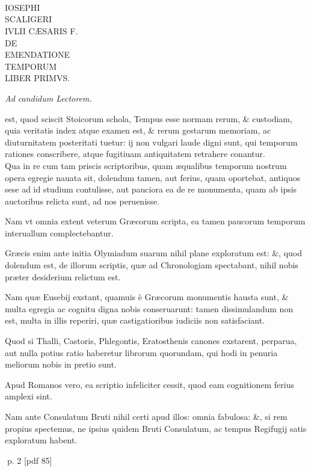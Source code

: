 
\chapter*{}
\begin{center}
\begin{textsc}
\\
\Large IOSEPHI\\
\Huge SCALIGERI\\
\Large IVLII CÆSARIS F.\\
\large DE\\
\Huge EMENDATIONE\\
\Large TEMPORUM\\
\large LIBER PRIMVS.\\
\end{textsc}
\em{Ad candidum Lectorem.}
\end{center}
\normalsize

\setcounter{parcount}{0}
\begin{parnumbers}
est, quod sciscit Stoicorum schola, Tempus esse normam rerum, \& custodiam, quia veritatis index atque examen est, \& rerum gestarum memoriam, ac diuturnitatem posteritati tuetur: ij non vulgari laude digni sunt, qui temporum rationes conscribere, atque fugitiuam antiquitatem retrahere conantur.
\\ \p
Qua in re cum tam priscis scriptoribus, quam æqualibus temporum nostrum opera egregie nauata sit, dolendum tamen, aut
ferius, quam oportebat, antiquos sese ad id studium contulisse, aut pauciora ea de re monumenta, quam ab ipsis auctoribus relicta sunt, ad nos peruenisse.

Nam vt omnia extent veterum Græcorum scripta, ea tamen paucorum temporum interuallum complectebantur.

Græcis enim ante initia Olymiadum suarum nihil plane exploratum est: \&, quod dolendum est, de illorum scriptis, quæ ad Chronologiam spectabant, nihil nobis præter desiderium relictum est.

Nam quæ Eusebij exstant, quamuis è Græcorum monumentis hausta sunt, \& multa egregia ac cognitu digna nobis conseruarunt: tamen dissimulandum non est, multa in illis reperiri, quæ castigatioribus iudiciis non satisfaciant.

Quod si Thalli, Castoris, Phlegontis, Eratosthenis canones exstarent, perparua, aut nulla potius ratio haberetur librorum quorundam, qui hodi in penuria meliorum nobis in pretio sunt.

Apud Romanos vero, ea scriptio infeliciter cessit, quod eam cognitionem ferius amplexi sint.

Nam ante Consulatum Bruti nihil certi apud illos: omnia fabulosa: \&, si rem propius spectemus, ne ipsius quidem Bruti Consulatum, ac tempus Regifugij satis exploratum habent.

\end{parnumbers}
\clearpage
p. 2 [pdf 85]

